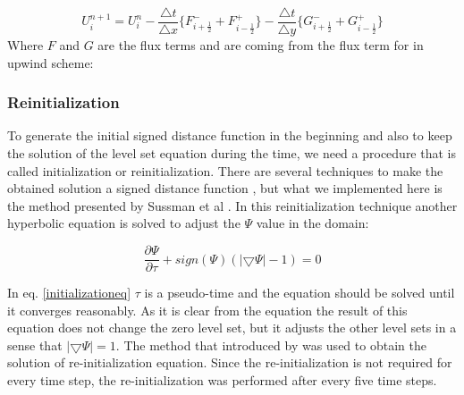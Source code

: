 \documentclass[letterpaper,10pt]{article}
\begin{document}
\begin{equation}
   \label{explicit}
   U_i^{n+1} = U_i^n - \frac{\bigtriangleup t}{\bigtriangleup x} \{F_{i+\frac{1}{2}}^- + F_{i-\frac{1}{2}}^+ \}
   - \frac{\bigtriangleup t}{\bigtriangleup y} \{G_{i+\frac{1}{2}}^- + G_{i-\frac{1}{2}}^+ \}
  \end{equation}
Where $F$ and $G$ are the flux terms and are coming from the flux term for in upwind scheme:


% 
% 
         

\subsubsection{Reinitialization} \label{reinitialization}

To generate the initial signed distance function in the beginning and also to keep the solution of the level set equation during 
the time, we need a procedure that is called initialization or reinitialization. There are several techniques to make the obtained 
solution a signed distance function \cite{Osher1988}, but what we implemented here is the method presented by 
Sussman et al \cite{Sussman}. In this reinitialization technique another hyperbolic equation is solved to adjust the $\varPsi$ value 
in the domain:

\begin{equation}\label{initializationeq}
 \frac{\partial \varPsi}{\partial \tau} + sign(\varPsi) (|\bigtriangledown \varPsi| - 1)= 0 
\end{equation}

In eq. \eqref{initializationeq} $\tau$ is a pseudo-time and the equation should be solved until it converges reasonably. 
As it is clear from the equation the result of this equation does not change the zero level set, but it adjusts the other level sets 
in a sense that $|\bigtriangledown \varPsi|=1$.
The method that introduced by \cite{Adalsteinsson1999} was used to obtain the solution of re-initialization equation. Since the re-initialization 
is not required for every time step, the re-initialization was performed after every five time steps.
\end{document}

